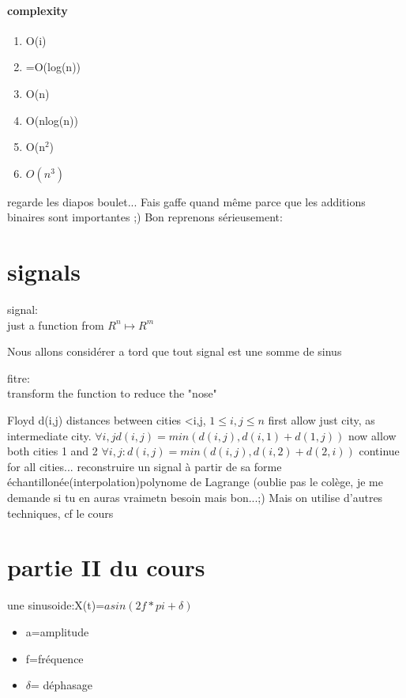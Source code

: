 \documentclass[a4paper,10pt]{article}
\begin{document}
 \paragraph{complexity}
 \begin{enumerate}
  \item O(i)
  \item =O(log(n))
  \item O(n)
  \item O(nlog(n))
  \item O(n$^2$)
  \item $O(n^3)$
 \end{enumerate}
 
 regarde les diapos boulet...
 \newline
 Fais gaffe quand même parce que les additions binaires sont importantes ;)
 \newline
 Bon reprenons sérieusement:
 \section{signals}
 \begin{description}
  \item signal:\\{just a function from $R^n\mapsto R^m$}
 \end{description}
Nous allons considérer a tord que tout signal est une somme de sinus
\begin{description}
\item fitre:\\{transform the function to reduce the "nose"}
\end{description}
Floyd d(i,j) distances between cities <i,j, $1\leq i,j\leq n$
\newline
first allow just city, as intermediate city. $\forall i,j d(i,j)=min(d(i,j),d(i,1)+d(1,j))$
\newline
now allow both cities 1 and 2 $\forall i,j:d(i,j)=min(d(i,j),d(i,2)+d(2,i))$
\newline
continue for all cities...
\newline
reconstruire un signal à partir de sa forme échantillonée(interpolation)polynome de Lagrange (oublie pas le colège, je me demande si tu en auras vraimetn besoin mais bon...;)
\newline
Mais on utilise d'autres techniques, cf le cours
\section{partie II du cours}
une sinusoide:X(t)=$asin(2f*pi+\delta)$
\begin{itemize}
 \item a=amplitude
 \item f=fréquence
 \item $\delta$= déphasage
\end{itemize}
\end{document}
